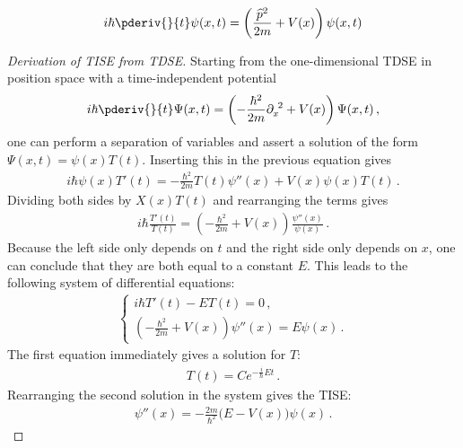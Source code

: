     \begin{example}
        \begin{gather}
            \label{wavematrix:TDSE_position}
            i\hbar\pderiv{}{t}\psi(x,t) = \left(\frac{\widehat{p}^2}{2m} + V(x)\right)\psi(x,t)
        \end{gather}
        \begin{mdframed}[roundcorner=10pt, linecolor=blue, linewidth=1pt]
            \begin{proof}[Derivation of TISE from TDSE]
                Starting from the one-dimensional TDSE in position space with a time-independent potential
                \begin{gather}
               		i\hbar\pderiv{}{t}\Psi(x,t) = \left(-\frac{\hbar^2}{2m}\partial_x^{\ 2} + V(x)\right)\Psi(x,t)\,,
               	\end{gather}
                one can perform a separation of variables and assert a solution of the form $\Psi(x,t) = \psi(x)T(t)$. Inserting this in the previous equation gives
                \begin{gather}
               		i\hbar\psi(x)T'(t) = -\frac{\hbar^2}{2m}T(t)\psi''(x) + V(x)\psi(x)T(t)\,.
               	\end{gather}
                Dividing both sides by $X(x)T(t)$ and rearranging the terms gives
                \begin{gather}
               		i\hbar\frac{T'(t)}{T(t)} = \left(-\frac{\hbar^2}{2m} + V(x)\right)\frac{\psi''(x)}{\psi(x)}\,.
               	\end{gather}
                Because the left side only depends on $t$ and the right side only depends on $x$, one can conclude that they are both equal to a constant $E$. This leads to the following system of differential equations:
                \begin{gather}
                    \begin{cases}
                        i\hbar T'(t) - ET(t) = 0\,,\\
                        \left(-\frac{\hbar^2}{2m} + V(x)\right)\psi''(x) = E\psi(x)\,.
                    \end{cases}
                \end{gather}
                The first equation immediately gives a solution for $T$:
                \begin{gather}
                    \label{derivations_qm:exponential}
               		T(t) = Ce^{-\frac{i}{\hbar}Et}\,.
               	\end{gather}
                Rearranging the second solution in the system gives the TISE:
                \begin{gather}
                    \label{derivations_qm:TISE}
               		\psi''(x) = -\frac{2m}{\hbar^2}\bigl(E - V(x)\bigr)\psi(x)\,.
               	\end{gather}$ $
            \end{proof}
        \end{mdframed}
    \end{example}

